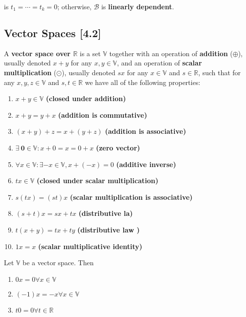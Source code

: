 \documentclass[a4paper,9pt]{extarticle}
\begin{document}
\begin{multicols*}{2}
is $t_1 = \cdots = t_k = 0$; otherwise, $\mathcal{B}$ is \textbf{linearly dependent}.


\subsection{Vector Spaces [4.2]}
A \textbf{vector space over $\mathbb{R}$} is a set $\mathbb{V}$ together with an operation of \textbf{addition} ($\oplus$), usually denoted $x + y$ for any $x, y \in \mathbb{V}$, and an operation of \textbf{scalar multiplication} ($\odot$), usually denoted $s x$ for any $x \in \mathbb{V}$ and $s \in \mathbb{R}$, such that for any $x, y, z \in \mathbb{V}$ and $s, t \in \mathbb{R}$ we have all of the following properties:

\begin{enumerate}[label=\bfseries V(\arabic*)] \itemsep0pt \parskip0pt 
    \item $x + y \in \mathbb{V}$ \textbf{(closed under addition)}
    \item $x + y = y + x$ \textbf{(addition is commutative)}
    \item $(x + y) + z = x + (y + z)$ \textbf{(addition is associative)}
    \item $\exists \> \textbf{0} \in \mathbb{V}: x + 0 = x = 0 + x$ \textbf{(zero vector)}
    \item $\forall x \in \mathbb{V}: \exists -x \in \mathbb{V}, x + (-x) = 0$ \textbf{(additive inverse)}
    \item $t x \in \mathbb{V}$ \textbf{(closed under scalar multiplication)}
    \item $s(t x) = (st)x$ \textbf{(scalar multiplication is associative)}
    \item $(s + t)x = s x + t x$ \textbf{(distributive la)}
    \item $t(x + y) = t x + t y$ \textbf{(distributive law )}
    \item $1 x = x$ \textbf{(scalar multiplicative identity)}
\end{enumerate}

Let $\mathbb{V}$ be a vector space. Then
\begin{enumerate}[label=\bfseries (\arabic*)] \itemsep0pt \parskip0pt 
    \item $0 x = 0 \forall x \in \mathbb{V}$
    \item $(-1) x = -x \forall x \in \mathbb{V}$
    \item $t 0 = 0 \forall t \in \mathbb{R}$
\end{enumerate}


\end{multicols*}
\end{document}

